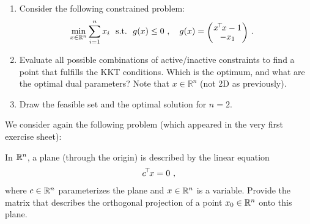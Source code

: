 

\renewcommand{\course}{Optimization Algorithms}
\renewcommand{\coursepicture}{optim}
\renewcommand{\coursedate}{Winter 2024/25}
\renewcommand{\exnum}{Weekly Exercises 5}

\exercises


\exercisestitle



\begin{enumerate}
	\item Consider the following constrained problem:
	\begin{align}
	\min_{x\in\RRR^n} \sum_{i=1}^n x_i \st& g(x) \le 0 \comma g(x) = \mat{c}{x^\T x - 1 \\ -x_1} ~.
	\end{align}

	\item Evaluate all possible combinations of active/inactive constraints to find a point that fulfills the KKT conditions. Which is the optimum, and what are the optimal dual parameters? Note that $x\in\mathbb{R}^n$ (not 2D as previously). 

	\item Draw the feasible set and the optimal solution for $n=2$.
\end{enumerate}



	We consider again the following problem (which appeared in the very first exercise sheet): \par

	In ${\mathbb{R}}^n$, a plane (through the origin) is described by
the linear equation
\begin{align}
  c^{\!\top\!} x = 0 ~,
\end{align}
where $c\in{\mathbb{R}}^n$ parameterizes the plane and $x\in{\mathbb{R}}^n$ is a variable. Provide the matrix that describes the orthogonal projection of a point $x_0 \in {\mathbb{R}}^n$ onto this plane. 




